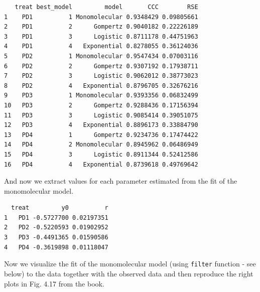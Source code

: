 \documentclass[
  letterpaper,
  DIV=11,
  numbers=noendperiod]{scrreprt}
\newenvironment{Shaded}{\begin{snugshade}}{\end{snugshade}}
\newcommand{\FunctionTok}[1]{\textcolor[rgb]{0.28,0.35,0.67}{#1}}
\newcommand{\NormalTok}[1]{\textcolor[rgb]{0.00,0.23,0.31}{#1}}
\newcommand{\SpecialCharTok}[1]{\textcolor[rgb]{0.37,0.37,0.37}{#1}}
\newcommand{\StringTok}[1]{\textcolor[rgb]{0.13,0.47,0.30}{#1}}
\begin{document}
\begin{verbatim}
   treat best_model         model       CCC        RSE
1    PD1          1 Monomolecular 0.9348429 0.09805661
2    PD1          2      Gompertz 0.9040182 0.22226189
3    PD1          3      Logistic 0.8711178 0.44751963
4    PD1          4   Exponential 0.8278055 0.36124036
5    PD2          1 Monomolecular 0.9547434 0.07003116
6    PD2          2      Gompertz 0.9307192 0.17938711
7    PD2          3      Logistic 0.9062012 0.38773023
8    PD2          4   Exponential 0.8796705 0.32676216
9    PD3          1 Monomolecular 0.9393356 0.06832499
10   PD3          2      Gompertz 0.9288436 0.17156394
11   PD3          3      Logistic 0.9085414 0.39051075
12   PD3          4   Exponential 0.8896173 0.33884790
13   PD4          1      Gompertz 0.9234736 0.17474422
14   PD4          2 Monomolecular 0.8945962 0.06486949
15   PD4          3      Logistic 0.8911344 0.52412586
16   PD4          4   Exponential 0.8739618 0.49769642
\end{verbatim}

And now we extract values for each parameter estimated from the fit of
the monomolecular model.

\begin{Shaded}
\end{Shaded}

\begin{verbatim}
  treat         y0          r
1   PD1 -0.5727700 0.02197351
2   PD2 -0.5220593 0.01902952
3   PD3 -0.4491365 0.01590586
4   PD4 -0.3619898 0.01118047
\end{verbatim}

Now we visualize the fit of the monomolecular model (using
\texttt{filter} function - see below) to the data together with the
observed data and then reproduce the right plots in Fig. 4.17 from the
book.
\end{document}
